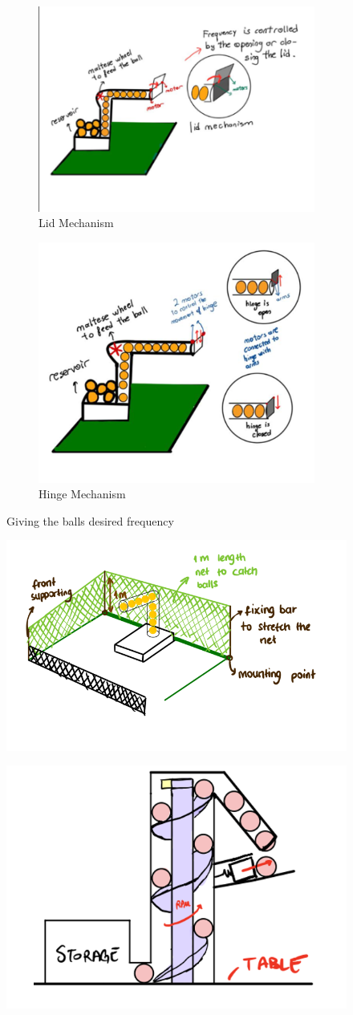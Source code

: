 \documentclass[12pt]{report}
\begin{document}
\begin{appendices}
\begin{figure}[H]
\begin{subfigure}{.5\textwidth}
  \centering
  \includegraphics[width=.4\linewidth]{lid.png}
  \caption{Lid Mechanism}
  \label{fig:lid_mechanism}
\end{subfigure}%
\begin{subfigure}{.5\textwidth}
  \centering
  \includegraphics[width=.4\linewidth]{hinge.png}
  \caption{Hinge Mechanism}
  \label{fig:hinge_mechanism}
\end{subfigure}%


\caption{Giving the balls desired frequency}
\label{fig:giving_frequency}
\end{figure}

\begin{figure}[H]
\centering
\begin{minipage}{.5\textwidth}
  \centering
  \includegraphics[width=.4\linewidth]{Function photos/net.png}
  \label{fig:net}
\end{minipage}%
\begin{minipage}{.5\textwidth}
  \centering
  \includegraphics[width=.4\linewidth]{Function photos/gravity.png}
  \label{fig:gravity}
\end{minipage}
\end{figure}




\end{appendices}
\end{document}
